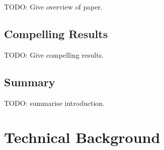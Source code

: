 \documentclass[a4paper,12pt,twoside,openright]{report}
\begin{document}
TODO: Give overview of paper.

\section{Compelling Results}

TODO: Give compelling results.

\section{Summary}

TODO: summarise introduction.

\chapter{Technical Background}

\label{chp:technical_background}





\end{document}
